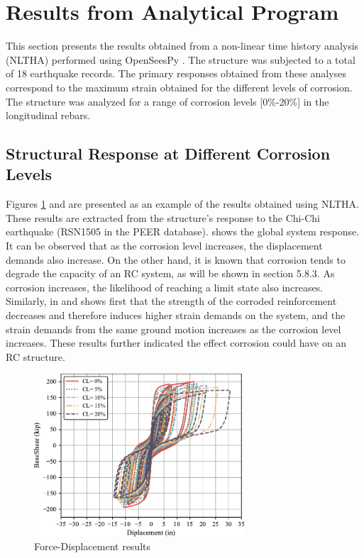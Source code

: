 \section{Results from Analytical Program}
This section presents the results obtained from a non-linear time history analysis (NLTHA) performed using OpenSeesPy \cite{Zhu2018}. The structure was subjected to a total of 18 earthquake records. The primary responses obtained from these analyses correspond to the maximum strain obtained for the different levels of corrosion. The structure was analyzed for a range of corrosion levels [0\%-20\%] in the longitudinal rebars.

\subsection{Structural Response at Different Corrosion Levels}
Figures \ref{fig:Force-Displacement_Results} and  are presented as an example of the results obtained using NLTHA. These results are extracted from the structure's response to the Chi-Chi earthquake (RSN1505 in the PEER database).  shows the global system response. It can be observed that as the corrosion level increases, the displacement demands also increase. On the other hand, it is known that corrosion tends to degrade the capacity of an RC system, as will be shown in section 5.8.3. As corrosion increases, the likelihood of reaching a limit state also increases. Similarly, in  and  shows first that the strength of the corroded reinforcement decreases and therefore induces higher strain demands on the system, and the strain demands from the same ground motion increases as the corrosion level increases. These results further indicated the effect corrosion could have on an RC structure.

\begin{figure}[htbp]
	\centering
	\includegraphics[width=0.7\textwidth]{Chapter-5/figs/Force_Diplacement_RSN1505.pdf}
	\caption{Force-Displacement results}
	\label{fig:Force-Displacement_Results}
\end{figure}

